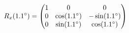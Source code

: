 \documentclass[preview]{standalone}
\begin{document}
\begin{align*}
\special{dvisvgm:raw <g id='unique000'>}R_x(1.1^\circ) = \begin{pmatrix} 1 & 0 & 0 \\ 0 & \cos(1.1^\circ) & -\sin(1.1^\circ) \\ 0 & \sin(1.1^\circ) & \cos(1.1^\circ) \end{pmatrix}\special{dvisvgm:raw </g>}
\end{align*}
\end{document}
